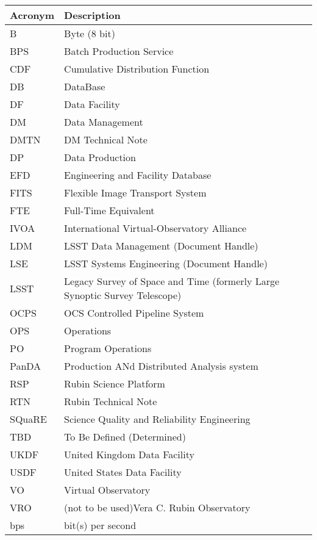 \addtocounter{table}{-1}
\begin{longtable}{p{}p{}}\hline
\textbf{Acronym} & \textbf{Description}  \\\hline

B & Byte (8 bit) \\\hline
BPS & Batch Production Service \\\hline
CDF & Cumulative Distribution Function \\\hline
DB & DataBase \\\hline
DF & Data Facility \\\hline
DM & Data Management \\\hline
DMTN & DM Technical Note \\\hline
DP & Data Production \\\hline
EFD & Engineering and Facility Database \\\hline
FITS & Flexible Image Transport System \\\hline
FTE & Full-Time Equivalent \\\hline
IVOA & International Virtual-Observatory Alliance \\\hline
LDM & LSST Data Management (Document Handle) \\\hline
LSE & LSST Systems Engineering (Document Handle) \\\hline
LSST & Legacy Survey of Space and Time (formerly Large Synoptic Survey Telescope) \\\hline
OCPS & OCS Controlled Pipeline System \\\hline
OPS & Operations \\\hline
PO & Program Operations \\\hline
PanDA &  Production ANd Distributed Analysis system \\\hline
RSP & Rubin Science Platform \\\hline
RTN & Rubin Technical Note \\\hline
SQuaRE & Science Quality and Reliability Engineering \\\hline
TBD & To Be Defined (Determined) \\\hline
UKDF & United Kingdom Data Facility \\\hline
USDF & United States Data Facility \\\hline
VO & Virtual Observatory \\\hline
VRO & (not to be used)Vera C. Rubin Observatory \\\hline
bps & bit(s) per second \\\hline
\end{longtable}
